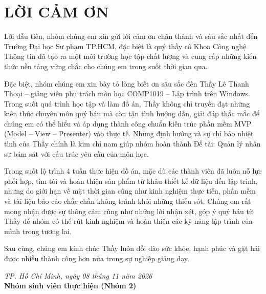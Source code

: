 \documentclass[12pt,a4paper]{report}
\begin{document}
\chapter*{LỜI CẢM ƠN}

Lời đầu tiên, nhóm chúng em xin gửi lời cảm ơn chân thành và sâu sắc nhất đến Trường Đại học Sư phạm TP.HCM, đặc biệt là quý thầy cô Khoa Công nghệ Thông tin đã tạo ra một môi trường học tập chất lượng và cung cấp những kiến thức nền tảng vững chắc cho chúng em trong suốt thời gian qua.

Đặc biệt, nhóm chúng em xin bày tỏ lòng biết ơn sâu sắc đến Thầy Lê Thanh Thoại -- giảng viên phụ trách môn học COMP1019 -- Lập trình trên Windows. Trong suốt quá trình học tập và làm đồ án, Thầy không chỉ truyền đạt những kiến thức chuyên môn quý báu mà còn tận tình hướng dẫn, giải đáp thắc mắc để chúng em có thể hiểu và áp dụng thành công chuẩn kiến trúc phần mềm MVP (Model -- View -- Presenter) vào thực tế. Những định hướng và sự chỉ bảo nhiệt tình của Thầy chính là kim chỉ nam giúp nhóm hoàn thành Đề tài: Quản lý nhân sự bám sát với cấu trúc yêu cầu của môn học.

Trong suốt lộ trình 4 tuần thực hiện đồ án, mặc dù các thành viên đã luôn nỗ lực phối hợp, tìm tòi và hoàn thiện sản phẩm từ khâu thiết kế dữ liệu đến lập trình, nhưng do giới hạn về mặt thời gian cũng như kinh nghiệm thực tiễn, phần mềm và tài liệu báo cáo chắc chắn không tránh khỏi những thiếu sót. Chúng em rất mong nhận được sự thông cảm cũng như những lời nhận xét, góp ý quý báu từ Thầy để nhóm có thể rút kinh nghiệm và hoàn thiện các kỹ năng lập trình của mình trong tương lai.

Sau cùng, chúng em kính chúc Thầy luôn dồi dào sức khỏe, hạnh phúc và gặt hái được nhiều thành công hơn nữa trong sự nghiệp giảng dạy.

\vspace{1.5cm}
\begin{flushright}
    \textit{TP. Hồ Chí Minh, ngày 08 tháng 11 năm 2026}\\
    \textbf{Nhóm sinh viên thực hiện (Nhóm 2)}
\end{flushright}

\newpage

\tableofcontents
\newpage

\end{document}
